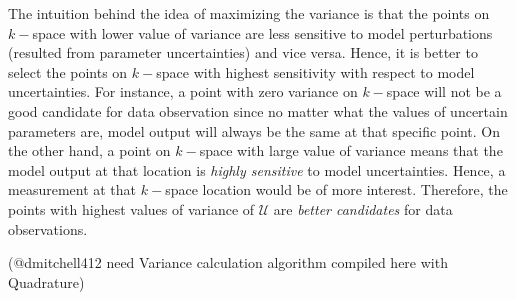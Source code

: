\documentclass{article}         %
\theoremstyle{definition}
\theoremstyle{remark}
\begin{document}
%
The intuition behind the idea of maximizing the variance is that the points on
$k-$space with lower value of variance are less sensitive to model
perturbations (resulted from parameter uncertainties) and vice versa. Hence, it
is better to select the points on $k-$space with highest sensitivity with
respect to model uncertainties. For instance, a point with zero variance on
$k-$space will not be a good candidate for data observation since no matter
what the values of uncertain parameters are, model output will always be the
same at that specific point. On the other hand, a point on $k-$space with large
value of variance means that the model output at that location is
\textit{highly sensitive} to model uncertainties. Hence, a measurement at that
$k-$space location would be of more interest. Therefore, the points with
highest values of variance of $\mathcal{U}$ are \textit{better candidates} for
data observations. 



{\color{red}(@dmitchell412 need Variance calculation algorithm compiled here with Quadrature)}
\end{document}
